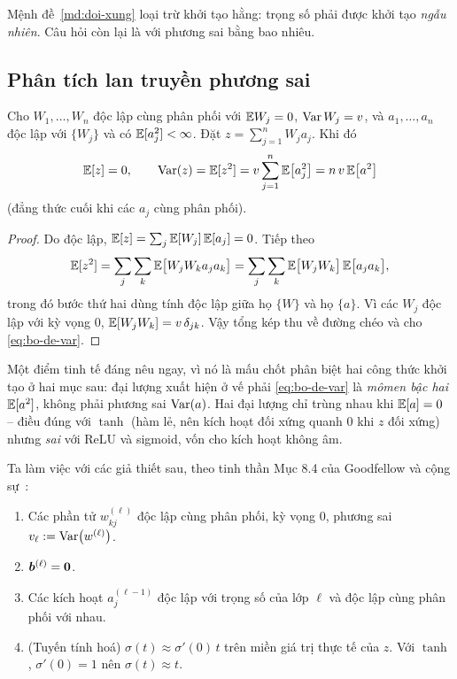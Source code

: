 Mệnh đề~\ref{md:doi-xung} loại trừ khởi tạo hằng: trọng số phải được khởi tạo
\emph{ngẫu nhiên}. Câu hỏi còn lại là với phương sai bằng bao nhiêu.
 
\subsection{Phân tích lan truyền phương sai}
\label{subsec:phuong-sai}
 
\begin{bode}
\label{bd:phuong-sai}
Cho $W_1,\dots,W_n$ độc lập cùng phân phối với $\mathbb{E} W_j = 0$, $\operatorname{Var} W_j = v$, và
$a_1,\dots,a_n$ độc lập với $\{W_j\}$ và có $\mathbb{E}[a_j^2] < \infty$. Đặt
$z = \sum_{j=1}^{n} W_j a_j$. Khi đó
\begin{equation}
\mathbb{E}[z] = 0, \qquad
\operatorname{Var}(z) = \mathbb{E}[z^2] = v \sum_{j=1}^{n} \mathbb{E}\big[a_j^2\big]
        = n\, v\, \mathbb{E}\big[a^2\big]
\label{eq:bo-de-var}
\end{equation}
(đẳng thức cuối khi các $a_j$ cùng phân phối).
\end{bode}
 
\begin{proof}
Do độc lập, $\mathbb{E}[z] = \sum_j \mathbb{E}[W_j]\,\mathbb{E}[a_j] = 0$. Tiếp theo
\[
\mathbb{E}[z^2] = \sum_{j}\sum_{k} \mathbb{E}\big[W_j W_k a_j a_k\big]
        = \sum_{j}\sum_{k} \mathbb{E}\big[W_j W_k\big]\, \mathbb{E}\big[a_j a_k\big],
\]
trong đó bước thứ hai dùng tính độc lập giữa họ $\{W\}$ và họ $\{a\}$. Vì các
$W_j$ độc lập với kỳ vọng $0$, $\mathbb{E}[W_jW_k] = v\,\delta_{jk}$. Vậy tổng kép thu
về đường chéo và cho \eqref{eq:bo-de-var}.
\end{proof}
 
Một điểm tinh tế đáng nêu ngay, vì nó là mấu chốt phân biệt hai công thức khởi
tạo ở hai mục sau: đại lượng xuất hiện ở vế phải \eqref{eq:bo-de-var} là
\emph{mômen bậc hai} $\mathbb{E}[a^2]$, không phải phương sai $\operatorname{Var}(a)$. Hai đại lượng
chỉ trùng nhau khi $\mathbb{E}[a] = 0$ -- điều đúng với $\tanh$ (hàm lẻ, nên kích hoạt
đối xứng quanh $0$ khi $z$ đối xứng) nhưng \emph{sai} với ReLU và sigmoid, vốn
cho kích hoạt không âm.
 
Ta làm việc với các giả thiết sau, theo tinh thần Mục 8.4 của Goodfellow và cộng
sự~\cite{goodfellow2016}:
 
\begin{enumerate}[label=(A\arabic*), leftmargin=*]
\item Các phần tử $w^{(\ell)}_{kj}$ độc lập cùng phân phối, kỳ vọng $0$, phương
      sai $v_\ell := \operatorname{Var}\!\big(w^{(\ell)}\big)$.
\item $\bm{b}^{(\ell)} = \bm{0}$.
\item Các kích hoạt $a^{(\ell-1)}_j$ độc lập với trọng số của lớp $\ell$ và độc
      lập cùng phân phối với nhau.
\item (Tuyến tính hoá) $\sigma(t) \approx \sigma'(0)\,t$ trên miền giá trị thực
      tế của $z$. Với $\tanh$, $\sigma'(0) = 1$ nên $\sigma(t)\approx t$.
\end{enumerate}
 
